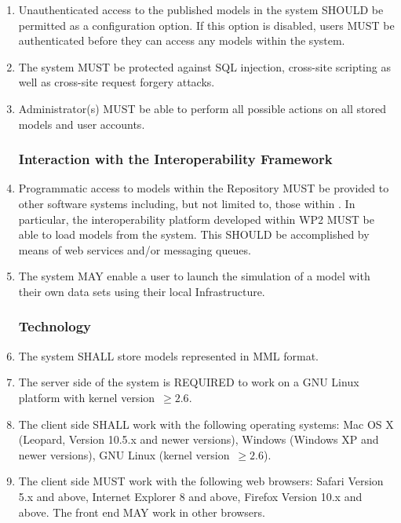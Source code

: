 \begin{enumerate}[1]
\item Unauthenticated access to the published models in the system SHOULD be permitted as a configuration option. If this option is disabled, users MUST be authenticated before they can access any models within the system.

\item The system MUST be protected against SQL injection, cross-site scripting as well as cross-site request forgery attacks.

\item Administrator(s) MUST be able to perform all possible actions on all stored models and user accounts.

\subsubsection{Interaction with the Interoperability Framework}
\item Programmatic access to models within the Repository MUST be provided to other software systems including, but not limited to, those within \ddmore. In particular, the interoperability platform developed within WP2 MUST be able to load models from the system. This SHOULD be accomplished by means of web services and/or messaging queues. 

\item The system MAY enable a user to launch the simulation of a model with their own data sets using their local Infrastructure. 

\subsubsection{Technology}
\item The system SHALL store models represented in MML format.

\item The server side of the system is REQUIRED to work on a GNU Linux platform with kernel version~$\ge 2.6$. 

\item The client side SHALL work with the following operating systems: Mac OS X (Leopard, Version 10.5.x and newer versions), Windows (Windows XP and newer versions), GNU Linux (kernel version~$\ge 2.6$).

\item The client side MUST work with the following web browsers: Safari Version 5.x and above, Internet Explorer 8 and above, Firefox Version 10.x and above. The front end MAY work in other browsers.


\end{enumerate}
